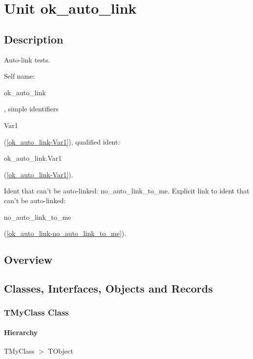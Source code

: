 \documentclass{report}
\begin{document}
\newlength{\tmplength}
\chapter{Unit ok{\_}auto{\_}link}
\section{Description}
Auto{-}link tests.\hfill\vspace*{1ex}



Self name: \begin{ttfamily}ok{\_}auto{\_}link\end{ttfamily}, simple identifiers \begin{ttfamily}Var1\end{ttfamily}(\ref{ok_auto_link-Var1}), qualified ident: \begin{ttfamily}ok{\_}auto{\_}link.Var1\end{ttfamily}(\ref{ok_auto_link-Var1}).

Ident that can't be auto{-}linked: no{\_}auto{\_}link{\_}to{\_}me. Explicit link to ident that can't be auto{-}linked: \begin{ttfamily}no{\_}auto{\_}link{\_}to{\_}me\end{ttfamily}(\ref{ok_auto_link-no_auto_link_to_me}).
\section{Overview}
\begin{description}
\item[\texttt{\begin{ttfamily}TMyClass\end{ttfamily} Class}]
\end{description}
\section{Classes, Interfaces, Objects and Records}
\subsection*{TMyClass Class}
\subsubsection*{\large{\textbf{Hierarchy}}\normalsize\hspace{1ex}\hfill}
TMyClass {$>$} TObject
\end{document}
